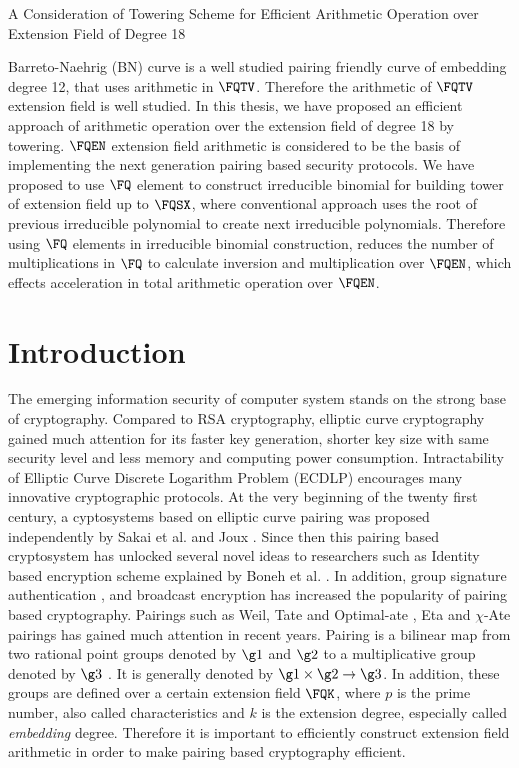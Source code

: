 A Consideration of Towering Scheme for Efficient Arithmetic Operation over Extension Field of Degree 18

Barreto-Naehrig (BN) curve is a well studied pairing friendly curve of embedding degree 12, that uses arithmetic in $\FQTV$. Therefore the arithmetic of $\FQTV$ extension field is well studied. In this thesis, we have proposed an efficient approach of arithmetic operation over the extension field of degree 18 by towering. $\FQEN$ extension field arithmetic is considered to be the basis of implementing the next generation pairing based security protocols. We have proposed to use $\FQ$ element to construct irreducible binomial for building tower of extension field up to $\FQSX$, where conventional approach uses the root of previous irreducible polynomial to create next irreducible polynomials. Therefore using $\FQ$ elements in irreducible binomial construction, reduces the number of multiplications in $\FQ$ to calculate inversion and multiplication over $\FQEN$, which effects acceleration in total arithmetic operation over $\FQEN$.



\section{Introduction}
The emerging information security of computer system stands on the strong base of cryptography. Compared to RSA cryptography, elliptic curve cryptography \cite{koblitz1987elliptic} gained much attention for its faster key generation, shorter key size with same security level and less memory and computing power consumption. Intractability of Elliptic Curve Discrete Logarithm Problem (ECDLP) encourages many innovative cryptographic protocols. At the very beginning of the twenty first century, a cyptosystems based on elliptic curve pairing was proposed independently by Sakai et al. \cite{EPRINT:SakKas03} and Joux \cite{JC:Joux04}. Since then this pairing based cryptosystem has unlocked several novel ideas to researchers such as Identity based encryption scheme explained by Boneh et al. \cite{C:BonFra01}. In addition, group signature authentication \cite{C:BonBoySha04},\cite{AC:NakFun05} and broadcast encryption \cite{C:BonGenWat05} has increased the popularity of pairing based cryptography. Pairings such as Weil\cite{Weil_p}, Tate and Optimal-ate \cite{DBLP:journals/tit/Vercauteren10}, Eta \cite{IEEETIT:HesSmaVer06} and $\chi$-Ate \cite{PAIRING:NASKM08} pairings has gained much attention in recent years. Pairing is a bilinear map from two rational point groups denoted by $\g1$ and $\g2$ to a multiplicative group denoted by $\g3$ \cite{Silverman}. It is generally denoted by $\g1 \times \g2 \rightarrow \g3$. In addition, these groups are defined over a certain extension field $\FQK$, where $p$ is the prime number, also called characteristics  and $k$ is the extension degree, especially called \textit{embedding} degree. 
Therefore it is important to efficiently construct extension field arithmetic in order to make pairing based cryptography efficient.

